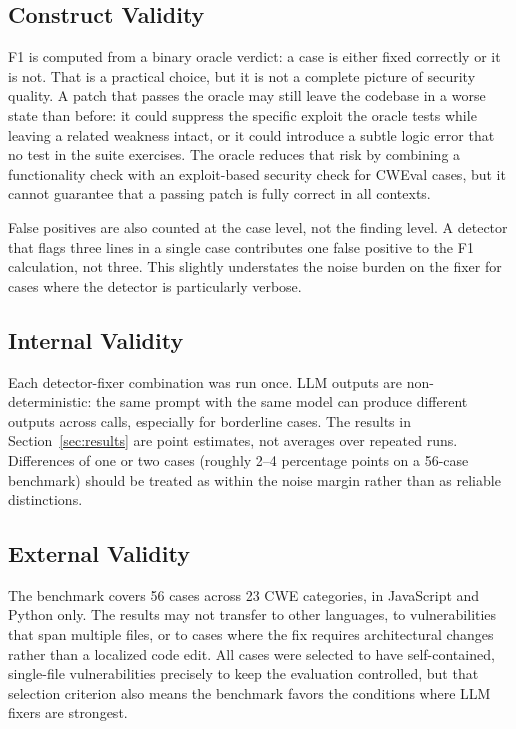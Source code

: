 \documentclass[12pt]{article}
\begin{document}
\subsection{Construct Validity}

F1 is computed from a binary oracle verdict: a case is either fixed correctly
or it is not. That is a practical choice, but it is not a complete picture of
security quality. A patch that passes the oracle may still leave the codebase
in a worse state than before: it could suppress the specific exploit the
oracle tests while leaving a related weakness intact, or it could introduce
a subtle logic error that no test in the suite exercises. The oracle reduces
that risk by combining a functionality check with an exploit-based security
check for CWEval cases, but it cannot guarantee that a passing patch is fully
correct in all contexts.

False positives are also counted at the case level, not the finding level.
A detector that flags three lines in a single case contributes one false
positive to the F1 calculation, not three. This slightly understates the
noise burden on the fixer for cases where the detector is particularly
verbose.

\subsection{Internal Validity}

Each detector-fixer combination was run once. LLM outputs are non-deterministic:
the same prompt with the same model can produce different outputs across calls,
especially for borderline cases. The results in Section~\ref{sec:results} are
point estimates, not averages over repeated runs. Differences of one or two
cases (roughly 2--4 percentage points on a 56-case benchmark) should be
treated as within the noise margin rather than as reliable distinctions.

\subsection{External Validity}

The benchmark covers 56 cases across 23 CWE categories, in JavaScript and
Python only. The results may not transfer to other languages, to
vulnerabilities that span multiple files, or to cases where the fix requires
architectural changes rather than a localized code edit. All cases were
selected to have self-contained, single-file vulnerabilities precisely to keep
the evaluation controlled, but that selection criterion also means the
benchmark favors the conditions where LLM fixers are strongest.
\end{document}
